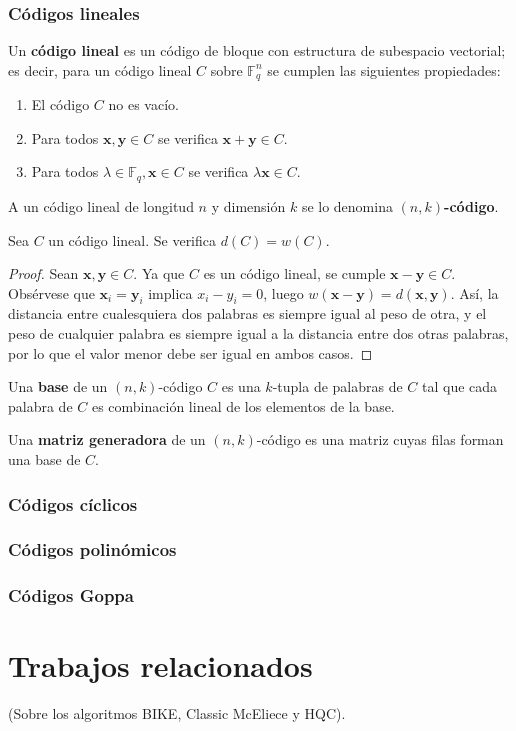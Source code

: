 \subsubsection{Códigos lineales}

\begin{definition}
	Un \textbf{código lineal} es un código de bloque con estructura de subespacio vectorial; es decir, para un código lineal $C$ sobre $\mathbb{F}_q^n$ se cumplen las siguientes propiedades:
	\begin{enumerate}
		\item El código $C$ no es vacío.
		\item Para todos $\textbf{x}, \textbf{y} \in C$ se verifica $\textbf{x} + \textbf{y} \in C$.
		\item Para todos $\lambda \in \mathbb{F}_q, \textbf{x} \in C$ se verifica $\lambda\textbf{x} \in C$.
	\end{enumerate}

	A un código lineal de longitud $n$ y dimensión $k$ se lo denomina \textbf{$(n, k)$-código}.
\end{definition}

\begin{theorem}
	Sea $C$ un código lineal. Se verifica $d(C) = w(C)$.
\end{theorem}

\begin{proof}
	Sean $\textbf{x}, \textbf{y} \in C$. Ya que $C$ es un código lineal, se cumple $\textbf{x} - \textbf{y} \in C$. Obsérvese que $\textbf{x}_i = \textbf{y}_i$ implica $x_i - y_i = 0$, luego $w(\textbf{x} - \textbf{y}) = d(\textbf{x}, \textbf{y})$. Así, la distancia entre cualesquiera dos palabras es siempre igual al peso de otra, y el peso de cualquier palabra es siempre igual a la distancia entre dos otras palabras, por lo que el valor menor debe ser igual en ambos casos.
\end{proof}

\begin{definition}
	Una \textbf{base} de un $(n, k)$-código $C$ es una $k$-tupla de palabras de $C$ tal que cada palabra de $C$ es combinación lineal de los elementos de la base.
\end{definition}

\begin{definition}
	Una \textbf{matriz generadora} de un $(n, k)$-código es una matriz cuyas filas forman una base de $C$.
\end{definition}

\subsubsection{Códigos cíclicos}

\subsubsection{Códigos polinómicos}

\subsubsection{Códigos Goppa}

\section{Trabajos relacionados}

(Sobre los algoritmos BIKE, Classic McEliece y HQC).

